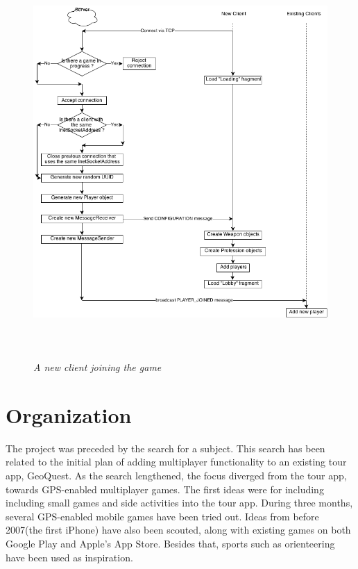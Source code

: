 \documentclass{article}
\begin{document}
\begin{figure}
\includegraphics[height=5.88in,width=6.23in]{./images/diagrams/Client-Server.png}
\caption{\small \sl A new client joining the game
\label{fig:client_server_flow}}
\end{figure}

\section{Organization}

The project was preceded by the search for a subject. This search has been
related to the initial plan of adding multiplayer functionality to an existing
tour app, GeoQuest. As the search lengthened, the focus diverged from the
tour app, towards GPS-enabled multiplayer games. The first ideas were for
including including small games and side activities into the tour app.
During three months, several GPS-enabled mobile games have been tried out.
Ideas from before 2007(the first iPhone) have also been scouted, along with
existing games on both Google Play and Apple's App Store. Besides that, sports
such as orienteering have been used as inspiration.\newline
\end{document}
